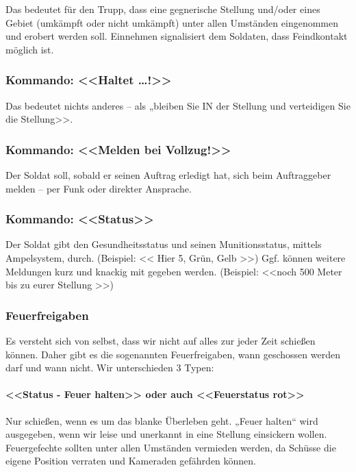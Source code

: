 	Das bedeutet für den Trupp, dass eine gegnerische Stellung und/oder eines Gebiet (umkämpft oder nicht umkämpft) unter allen Umständen eingenommen und erobert werden soll. Einnehmen signalisiert dem Soldaten, dass Feindkontakt möglich ist. \\

\subsubsection{Kommando: <<Haltet …!>>}

	Das bedeutet nichts anderes – als „bleiben Sie IN der Stellung und verteidigen Sie die Stellung>>. \\

\subsubsection{Kommando: <<Melden bei Vollzug!>>}

	Der Soldat soll, sobald er seinen Auftrag erledigt hat, sich beim Auftraggeber melden – per Funk oder direkter Ansprache. \\

\subsubsection{Kommando: <<Status>>}

	Der Soldat gibt den Gesundheitsstatus und seinen Munitionsstatus, mittels Ampelsystem, durch. (Beispiel: << Hier 5, Grün, Gelb >>) Ggf. können weitere Meldungen kurz und knackig mit gegeben werden. (Beispiel: <<noch 500 Meter bis zu eurer Stellung >>) \\

\subsubsection{Feuerfreigaben}

	Es versteht sich von selbst, dass wir nicht auf alles zur jeder Zeit schießen können. Daher gibt es die sogenannten Feuerfreigaben, wann geschossen werden darf und wann nicht. Wir unterschieden 3 Typen: \\

\paragraph{<<Status - Feuer halten>>  oder auch <<Feuerstatus rot>> }

	Nur schießen, wenn es um das blanke Überleben geht. „Feuer halten“ wird ausgegeben, wenn wir leise und unerkannt in eine Stellung einsickern wollen. Feuergefechte sollten unter allen Umständen vermieden werden, da Schüsse die eigene Position verraten und Kameraden gefährden können. \\

